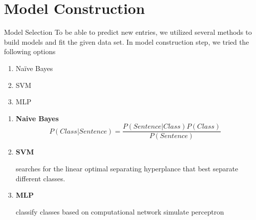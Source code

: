 \documentclass{beamer}
\begin{document}

\section{Model Construction}

\begin{frame}{Model Selection}
    To be able to predict new entries, we utilized several methods to build models and fit the given data set.
    In model construction step, we tried the following options
    \begin{enumerate}
        \item Na\"ive Bayes
        \item SVM
        \item MLP
    \end{enumerate}
\end{frame}
\begin{frame}{}
\begin{enumerate}
    \item \textbf{Naive Bayes}
    $$P(Class|Sentence)=\frac{P(Sentence|Class)P(Class)}{P(Sentence)}$$
    \item \textbf{SVM}
    
    searches for the linear optimal separating hyperplance that best separate different classes.
    \item \textbf{MLP}
    
    classify classes based on computational network simulate perceptron
    
\end{enumerate}
\end{frame}
\end{document}
